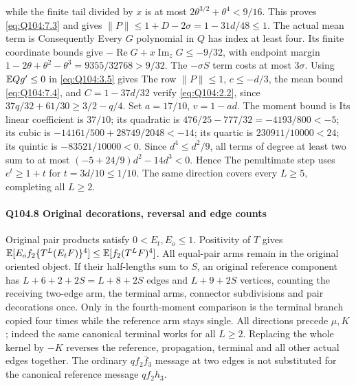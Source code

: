 while the finite tail divided by $x$ is at most
$2\theta^{3/2}+\theta^4<\allowbreak 9/16$.
This proves \eqref{eq:Q104:7.3} and gives
$\|P\|\le\allowbreak 1+D-2\sigma=\allowbreak 1-31d/48\le\allowbreak 1$.
The actual mean term is
Consequently
Every $G$ polynomial in $Q$ has index at least four.
Its finite coordinate bounds give
$-\operatorname{Re}G+x\operatorname{Im}_zG\le\allowbreak -9/32$,
with endpoint margin $1-2\theta+\theta^2-\theta^3=\allowbreak 9355/32768>\allowbreak 9/32$.
The $-\sigma S$ term costs at most $3\sigma$.
Using $\mathbb E Qg'\le\allowbreak 0$ in \eqref{eq:Q104:3.5} gives
The row $\|P\|\le\allowbreak 1$, $c\le\allowbreak -d/3$, the mean bound
\eqref{eq:Q104:7.4}, and $C=\allowbreak 1-37d/32$ verify
\eqref{eq:Q104:2.2}, since $37q/32+61/30\ge\allowbreak 3/2-q/4$.
Set $a=\allowbreak 17/10$, $v=\allowbreak 1-ad$. The moment bound is
Its linear coefficient is $37/10$; its quadratic is
$476/25-777/32=\allowbreak -4193/800<\allowbreak -5$; its cubic is
$-14161/500+28749/2048<\allowbreak -14$; its quartic is
$230911/10000<\allowbreak 24$; its quintic is $-83521/10000<\allowbreak 0$.
Since $d^4\le\allowbreak  d^2/9$, all terms of degree at least two sum to at most
$(-5+24/9)d^2-14d^3<\allowbreak 0$. Hence
The penultimate step uses $e^t\ge\allowbreak 1+t$ for $t=\allowbreak 3d/10\le\allowbreak 1/10$.
The same direction covers every $L\ge\allowbreak 5$, completing all $L\ge\allowbreak 2$.

\paragraph{Q104.8 Original decorations, reversal and edge counts}\label{part:Q104.8}
Original pair products satisfy $0<\allowbreak E_t,\allowbreak E_o\le\allowbreak 1$.
Positivity of $T$ gives
$\mathbb E[E_of_2\{T^L(E_tF)\}^4]\le\allowbreak \mathbb E[f_2(T^LF)^4]$.
All equal-pair arms remain in the original oriented object.
If their half-lengths sum to $S$, an original reference component has
$L+6+2+2S=\allowbreak L+8+2S$ edges and $L+9+2S$ vertices, counting the
receiving two-edge arm, the terminal arms, connector subdivisions and
pair decorations once. Only in the fourth-moment comparison is the
terminal branch copied four times while the reference arm stays single.
All directions precede $\mu,\allowbreak K$; indeed the same canonical terminal works
for all $L\ge\allowbreak 2$.
Replacing the whole kernel by $-K$ reverses the reference, propagation,
terminal and all other actual edges together.
The ordinary $qf_2\bar f_3$ message at two edges is not substituted
for the canonical reference message $qf_2h_3$.
